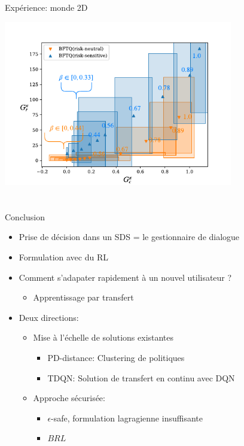 \documentclass[french,handout]{beamer}
\begin{document}
    \begin{frame}{Expérience: monde 2D}
        \begin{center}
            \includegraphics[page=1, width=0.75\textwidth]{img/corridors}
        \end{center}
    \end{frame}

    \section{}
    \subsection{}
    \begin{frame}{Conclusion}
        \begin{itemize}
            \item Prise de décision dans un SDS = le gestionnaire de dialogue
            \item Formulation avec du RL
            \item Comment s'adapater rapidement à un nouvel utilisateur ?
            \begin{itemize}
                \item Apprentissage par transfert
            \end{itemize}
            \item Deux directions:
            \begin{itemize}
                \item Mise à l'échelle de solutions existantes
                \begin{itemize}
                    \item PD-distance: Clustering de politiques
                    \item TDQN: Solution de transfert en continu avec DQN
                \end{itemize}
                \item Approche sécurisée:
                \begin{itemize}
                    \item $\epsilon$-safe, formulation lagragienne insuffisante
                    \item $BRL$
                \end{itemize}
            \end{itemize}
        \end{itemize}
    \end{frame}
\end{document}
